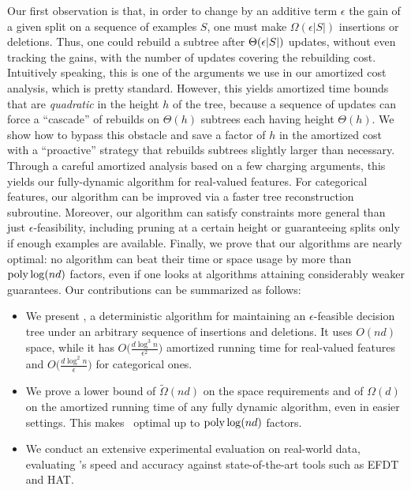 Our first observation is that, in order to change by an additive term $\epsilon$ the gain of a given split on a sequence of examples $S$, one must make $\Omega(\epsilon |S|)$ insertions or deletions. Thus, one could rebuild a subtree after $\Theta(\epsilon |S|)$ updates, without even tracking the gains, with the number of updates covering the rebuilding cost. Intuitively speaking, this is one of the arguments we use in our amortized cost analysis, which is pretty standard. However, this yields amortized time bounds that are \emph{quadratic} in the height $h$ of the tree, because a sequence of updates can force a ``cascade'' of rebuilds on $\Theta(h)$ subtrees each having height $\Theta(h)$.
We show how to bypass this obstacle and save a factor of $h$ in the amortized cost with a ``proactive'' strategy that rebuilds subtrees slightly larger than necessary. Through a careful amortized analysis based on a few charging arguments, this yields our fully-dynamic algorithm for real-valued features. For categorical features, our algorithm can be improved via a faster tree reconstruction subroutine. Moreover, our algorithm can satisfy constraints more general than just $\epsilon$-feasibility, including pruning at a certain height or guaranteeing splits only if enough examples are available. Finally, we prove that our algorithms are nearly optimal: no algorithm can beat their time or space usage by more than $\operatorname{poly}\log(nd)$ factors, even if one looks at algorithms attaining considerably weaker guarantees.
%
Our contributions can be summarized as follows:
\begin{itemize}

\item We present \algo, a deterministic algorithm for maintaining an $\epsilon$-feasible decision tree under an arbitrary sequence of insertions and deletions. It uses $O(nd)$ space, while it has $O\big(\frac{d \log^3 n} {\epsilon^2} \big)$ amortized running time for real-valued features and $O\big(\frac{d \log^2 n} {\epsilon} \big)$ for categorical ones.
\item We prove a lower bound of $\tilde{\Omega} (n d )$ on the space requirements and of $\Omega(d)$ on the amortized running time of any fully dynamic algorithm, even in easier settings. This makes \algo\ optimal up to $\operatorname{poly} \log (nd)$ factors.
\item We conduct an extensive experimental evaluation on real-world data, evaluating \algo's speed and accuracy against state-of-the-art tools such as EFDT and HAT.
\end{itemize}

